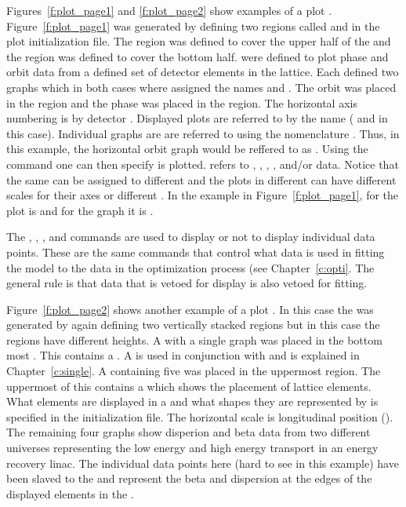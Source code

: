 Figures~\ref{f:plot_page1} and \ref{f:plot_page2} show examples of a
plot . Figure~\ref{f:plot_page1} was generated by defining
two regions called  and  in the plot initialization
file. The  region was defined to cover the upper half of the
 and the  region was defined to cover the bottom
half.  were defined to plot phase and orbit data
from a defined set of detector elements in the lattice. Each
 defined two graphs which in both cases where
assigned the names  and . The orbit  was
placed in the  region and the phase  was
placed in the  region. The horizontal axis numbering is by
detector .  Displayed plots are referred to by the
 name ( and  in this case). Individual
graphs are are referred to using the nomenclature
. Thus, in this example, the horizontal orbit graph
would be reffered to as .  Using the  command one
can then specify  is plotted.  refers to
, , , , and/or
 data.  Notice that the same  can be
assigned to different  and the plots in different
 can have different scales for their axes or different
. In the example in Figure~\ref{f:plot_page1},  for the
 plot is  and for the  graph it is
.

The , , , and  commands are used
to display or not to display individual data points. These are the
same commands that control what data is used in fitting the model to
the data in the optimization process (see Chapter~\ref{c:opti}. The
general rule is that data that is vetoed for display is also vetoed
for fitting.

Figure~\ref{f:plot_page2} shows another example of a plot .
In this case the  was generated by again defining two
vertically stacked regions but in this case the regions have different
heights.  A  with a single graph was placed in the
bottom most .  This  contains a .
A  is used in conjunction with  and is
explained in Chapter~\ref{c:single}. A  containing
five  was placed in the uppermost region. The uppermost
 of this  contains a  which
shows the placement of lattice elements.  What elements are displayed
in a  and what shapes they are represented by is
specified in the initialization file. The horizontal scale is
longitudinal position ().  The remaining four graphs show
disperion and beta data from two different universes representing the
low energy and high energy transport in an energy recovery linac. The
individual data points here (hard to see in this example) have been
slaved to the  and represent the beta and dispersion at
the edges of the displayed elements in the .


